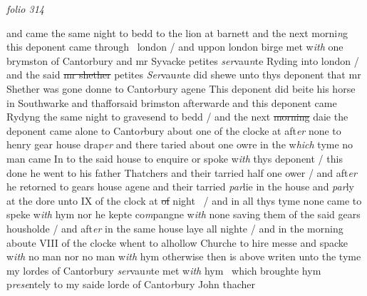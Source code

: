 \documentclass[12pt, a4paper]{book}
\begin{document}
               
\dotfill
					

\textit{folio 314}


and came the same night to bedd to the lion at barnett and the next morni\textit{n}g this deponent came through  
				\marginpar[\vspace{0.5cm}{\textcolor{Gray}{n}}]{}
			 london / and uppon london birge met w\textit{ith} one brymston of Cantorbury and mr Syvacke petites\textit{ ser}vau\textit{n}te Ryding into london / and the said \sout{mr shether} petites \textit{Ser}vau\textit{n}te did shewe unto thys deponent that mr Shether was gone donne to Canto\textit{r}bury agene This deponent did beite his horse in Southwarke and thafforsaid brimston afterwarde and this  deponent came Rydyng the same night to  gravesend to bedd / and the next \sout{morning }
               daie 
			the  deponent came alone to Canto\textit{r}bury about one of the clocke at aft\textit{er} none to henry gear house drap\textit{er} and there taried about one owre in the w\textit{hich} tyme no man came In to the said  house to enquire or spoke w\textit{ith} thys deponent / this done he went to his father Thatchers and their tarried half one ower / and aft\textit{er }he  retorned to gears house agene and their  tarried \textit{par}lie in the house and \textit{par}ly at the dore unto IX of the clock at \sout{of }night  / and in all thys  tyme none came to speke w\textit{ith }hym nor he kepte co\textit{m}pangne w\textit{ith} none saving them of the said gears housholde / and aft\textit{er} in the same house laye all nighte / and in the morning  aboute VIII of the clocke whent to alhollow  Churche to hire messe and spacke w\textit{ith} no man nor no man w\textit{ith} hym otherwise then is above writen unto the tyme my lordes of Cantorbury \textit{ser}vau\textit{n}te met w\textit{ith} hym  which broughte hym  p\textit{rese}ntely to my saide lorde of Canto\textit{r}bury  John thacher

\dotfill
					  \section*{}  \subsection*{}
\end{document}
